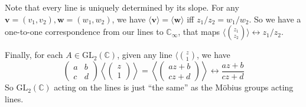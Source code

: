 \documentclass[a4paper]{article}
\theoremstyle{definition}
\newcommand{\mb}[1]{\mathbf{#1}}
\newcommand{\C}{\mathbb{C}}
\newcommand{\bra}{\langle}
\newcommand{\ket}{\rangle}
\newcommand{\GL}{\mathrm{GL}}
\begin{document}
Note that every line is uniquely determined by its slope. For any $\mb{v} = (v_1, v_2), \mb{w} = (w_1, w_2)$, we have $\bra \mb{v}\ket = \bra \mb{w}\ket$ iff $z_1/z_2 = w_1/w_2$. So we have a one-to-one correspondence from our lines to $\C_\infty$, that maps $\bra {z_1\choose z_2}\ket\leftrightarrow z_1/z_2$.

Finally, for each $A\in \GL_2(\C)$, given any line $\bra {z\choose 1}$, we have
\[
\begin{pmatrix}
  a & b\\
  c & d
\end{pmatrix}
\left\bra
\begin{pmatrix}
  z\\1
\end{pmatrix}\right\ket = \left\bra 
\begin{pmatrix}
  az + b\\
  cz + d
\end{pmatrix}
\right\ket \leftrightarrow \frac{az + b}{cz + d}
\]
So $\GL_2(\C)$ acting on the lines is just ``the same'' as the M\"obius groups acting lines.
\end{document}
